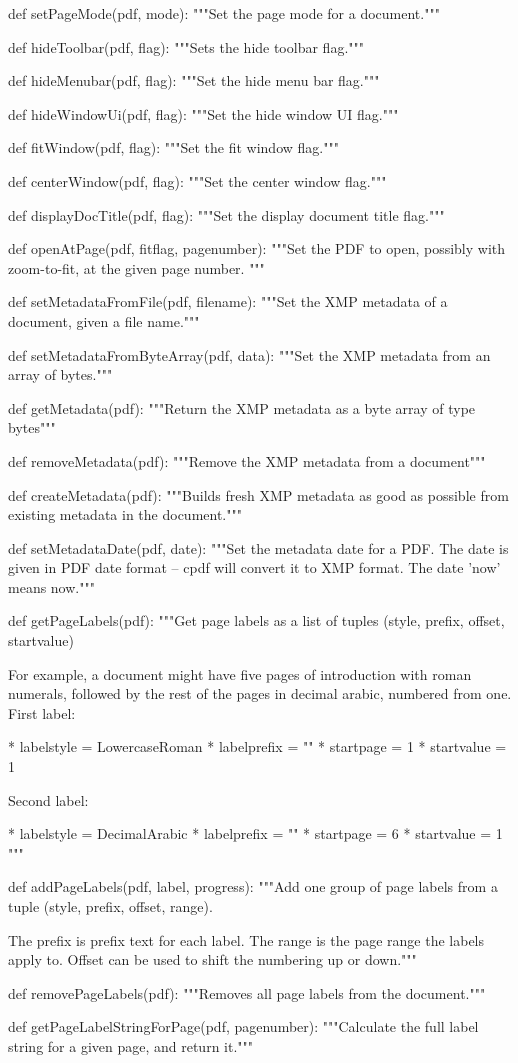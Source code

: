 def setPageMode(pdf, mode):
    """Set the page mode for a document."""

def hideToolbar(pdf, flag):
    """Sets the hide toolbar flag."""

def hideMenubar(pdf, flag):
    """Set the hide menu bar flag."""

def hideWindowUi(pdf, flag):
    """Set the hide window UI flag."""

def fitWindow(pdf, flag):
    """Set the fit window flag."""

def centerWindow(pdf, flag):
    """Set the center window flag."""

def displayDocTitle(pdf, flag):
    """Set the display document title flag."""

def openAtPage(pdf, fitflag, pagenumber):
    """Set the PDF to open, possibly with zoom-to-fit, at the given page number.
    """

def setMetadataFromFile(pdf, filename):
    """Set the XMP metadata of a document, given a file name."""

def setMetadataFromByteArray(pdf, data):
    """Set the XMP metadata from an array of bytes."""

def getMetadata(pdf):
    """Return the XMP metadata as a byte array of type bytes"""

def removeMetadata(pdf):
    """Remove the XMP metadata from a document"""

def createMetadata(pdf):
    """Builds fresh XMP metadata as good as possible from existing
    metadata in the document."""

def setMetadataDate(pdf, date):
    """Set the metadata date for a PDF. The date is given in PDF date format --
    cpdf will convert it to XMP format. The date 'now' means now."""

def getPageLabels(pdf):
    """Get page labels as a list of tuples (style, prefix, offset, startvalue)

    For example, a document might have five pages of introduction with roman
    numerals, followed by the rest of the pages in decimal arabic, numbered
    from one. First label:

    * labelstyle = LowercaseRoman
    * labelprefix = ""
    * startpage = 1
    * startvalue = 1

    Second label:

    * labelstyle = DecimalArabic
    * labelprefix = ""
    * startpage = 6
    * startvalue = 1 """

def addPageLabels(pdf, label, progress):
    """Add one group of page labels from a tuple (style, prefix, offset, range).

    The prefix is prefix text for each label. The range is the page range the
    labels apply to. Offset can be used to shift the numbering up or down."""

def removePageLabels(pdf):
    """Removes all page labels from the document."""

def getPageLabelStringForPage(pdf, pagenumber):
    """Calculate the full label string for a given page, and return it."""
